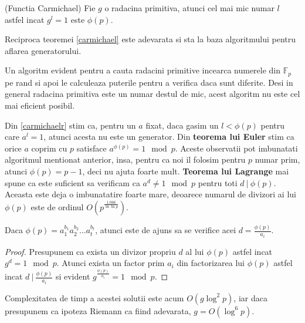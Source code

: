 \begin{thm}
  \label{carmichael}
  (Functia Carmichael) Fie $g$ o radacina primitiva, atunci cel mai mic numar $l$ astfel incat $g^{l} = 1$ este $\phi(p)$.
\end{thm}

\begin{thm}
  \label{carmichaelr}
  Reciproca teoremei \ref{carmichael} este adevarata si sta la baza algoritmului pentru aflarea generatorului.
\end{thm}

Un algoritm evident pentru a cauta radacini primitive incearca numerele din $\mathbb{F}_{p}$ pe rand si apoi le calculeaza
puterile pentru a verifica daca sunt diferite. Desi in general radacina primitiva este un numar destul de mic, acest algoritm
nu este cel mai eficient posibil.

Din \ref{carmichaelr} stim ca, pentru un $a$ fixat, daca gasim un $l < \phi(p)$ pentru care $a^{l} = 1$, atunci acesta nu este un
generator. Din \textbf{teorema lui Euler} stim ca orice $a$ coprim cu $p$ satisface $a^{\phi(p)} = 1 \mod p$. Aceste observatii pot
imbunatati algoritmul mentionat anterior, insa, pentru ca noi il folosim pentru $p$ numar prim, atunci $\phi(p) = p - 1$, deci nu
ajuta foarte mult. \textbf{Teorema lui Lagrange} mai spune ca este suficient sa verificam ca $a^{d} \neq 1 \mod p$ pentru toti $d \ |\ \phi(p)$.
Aceasta este deja o imbunatatire foarte mare, deoarece numarul de divizori ai lui $\phi(p)$ este de ordinul $O(p^{\frac{1.066}{\ln \ln p}})$.

Daca $\phi(p) = a_{1}^{b_{1}} a_{2}^{b_{2}} \ldots a_{t}^{b_{t}}$, atunci este de ajuns sa se verifice acei $d = \frac{\phi(p)}{a_{i}}$.

\begin{proof}
  Presupunem ca exista un divizor propriu $d$ al lui $\phi(p)$ astfel incat $g^{d} = 1 \mod p$. Atunci exista un factor prim $a_{i}$
  din factorizarea lui $\phi(p)$ astfel incat $d \ | \ \frac{\phi(p)}{a_{i}}$ si evident $g^{\frac{\phi(p)}{a_{i}}} = 1 \mod p$.
\end{proof}

Complexitatea de timp a acestei solutii este acum $O(g \log^{2} p)$, iar daca presupunem ca ipoteza Riemann ca fiind adevarata, $g = O(\log^{6} p)$.
